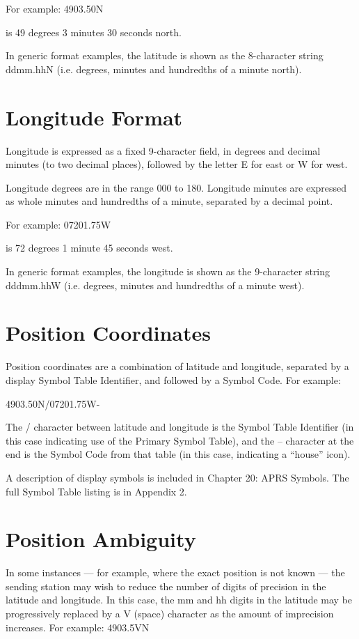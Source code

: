 For example:
4903.50N

is 49 degrees 3 minutes 30 seconds north.

In generic format examples, the latitude is shown as the 8-character string
ddmm.hhN (i.e. degrees, minutes and hundredths of a minute north).

\section{Longitude Format}

Longitude is expressed as a fixed 9-character field, in degrees and decimal
minutes (to two decimal places), followed by the letter E for east or W for
west.


Longitude degrees are in the range 000 to 180. Longitude minutes are
expressed as whole minutes and hundredths of a minute, separated by a
decimal point.

For example:
07201.75W

is 72 degrees 1 minute 45 seconds west.

In generic format examples, the longitude is shown as the 9-character string
dddmm.hhW (i.e. degrees, minutes and hundredths of a minute west).

\section{Position Coordinates}

Position coordinates are a combination of latitude and longitude, separated
by a display Symbol Table Identifier, and followed by a Symbol Code. For
example:

4903.50N/07201.75W-

The / character between latitude and longitude is the Symbol Table
Identifier (in this case indicating use of the Primary Symbol Table), and the –
character at the end is the Symbol Code from that table (in this case,
indicating a “house” icon).

A description of display symbols is included in Chapter 20: APRS Symbols.
The full Symbol Table listing is in Appendix 2.

\section{Position Ambiguity}

In some instances — for example, where the exact position is not known —
the sending station may wish to reduce the number of digits of precision in
the latitude and longitude. In this case, the mm and hh digits in the latitude
may be progressively replaced by a V (space) character as the amount of
imprecision increases. For example:
4903.5VN

